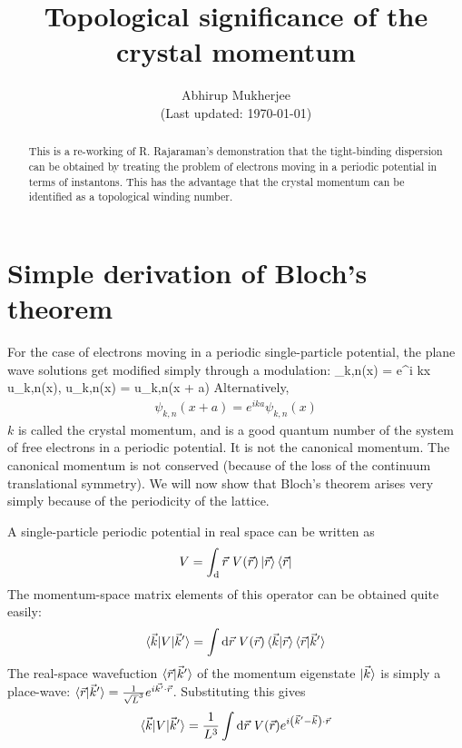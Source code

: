 \documentclass[12pt,onecolumn]{revtex4-2}
\begin{document}
\title{\textbf{Topological significance of the crystal momentum}}
\author{Abhirup Mukherjee\\[5pt]
(Last updated: \today)}
\begin{abstract}
	This is a re-working of R. Rajaraman's demonstration that the tight-binding dispersion can be obtained by treating the problem of electrons moving in a periodic potential in terms of instantons. This has the advantage that the crystal momentum can be identified as a topological winding number.
\end{abstract}
\maketitle
\section{Simple derivation of Bloch's theorem}

For the case of electrons moving in a periodic single-particle potential, the plane wave solutions get modified simply through a modulation:
\beq
\psi_{k,n}(x) = e^{i k\cdot x} u_{k,n}(x), \quad{}\quad u_{k,n}(x) = u_{k,n}(x + a)
\eeq
Alternatively,
\begin{equation}\begin{aligned}
	\label{Bloch}
	\psi_{k,n}(x + a) = e^{i k a} \psi_{k,n}(x)
\end{aligned}\end{equation}
\(k\) is called the crystal momentum, and is a good quantum number of the system of free electrons in a periodic potential. It is not the canonical momentum. The canonical momentum is not conserved (because of the loss of the continuum translational symmetry). We will now show that Bloch's theorem arises very simply because of the periodicity of the lattice.

A single-particle periodic potential in real space can be written as
\begin{equation}\begin{aligned}
	V = \int_ \mathrm{d}\vec r ~V(\vec r)\ket{\vec r}\bra{\vec r}
\end{aligned}\end{equation}
The momentum-space matrix elements of this operator can be obtained quite easily:
\begin{equation}\begin{aligned}
	\braket{\vec k | V | \vec k^\prime} =  \int \mathrm{d}\vec r ~V(\vec r)\braket{\vec k |\vec r}\braket{\vec r | \vec k^\prime}
\end{aligned}\end{equation}
The real-space wavefuction \(\braket{\vec r | \vec k^\prime}\) of the momentum eigenstate \(\ket{\vec k}\) is simply a place-wave: \(\braket{\vec r | \vec k^\prime} = \frac{1}{\sqrt L^3} e^{i \vec{k^\prime}\cdot\vec{r}}\). Substituting this gives
\begin{equation}\begin{aligned}
	\braket{\vec k | V | \vec k^\prime} =  \frac{1}{L^3}\int \mathrm{d}\vec r ~V(\vec r) e^{i\left( \vec k^\prime - \vec k \right) \cdot \vec r}
\end{aligned}\end{equation}
\end{document}
